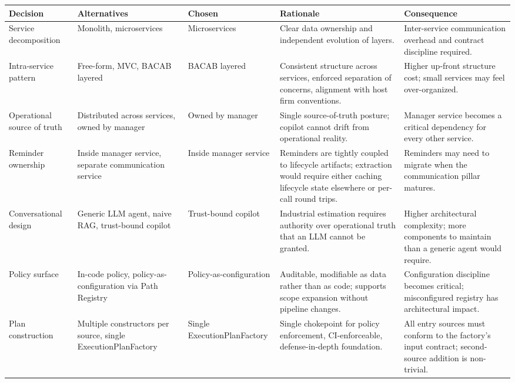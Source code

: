 \begin{table}[H]
\centering
\renewcommand{\arraystretch}{1.4}
\footnotesize
\begin{tabular}{|p{2.6cm}|p{2.5cm}|p{2.5cm}|p{3cm}|p{3cm}|}
\hline
\rowcolor{lightgray}
\textbf{Decision} & \textbf{Alternatives} & \textbf{Chosen} & \textbf{Rationale} & \textbf{Consequence} \\ \hline
Service decomposition & Monolith, microservices & Microservices & Clear data ownership and independent evolution of layers. & Inter-service communication overhead and contract discipline required. \\ \hline
Intra-service pattern & Free-form, MVC, BACAB layered & BACAB layered & Consistent structure across services, enforced separation of concerns, alignment with host firm conventions. & Higher up-front structure cost; small services may feel over-organized. \\ \hline
Operational source of truth & Distributed across services, owned by manager & Owned by manager & Single source-of-truth posture; copilot cannot drift from operational reality. & Manager service becomes a critical dependency for every other service. \\ \hline
Reminder ownership & Inside manager service, separate communication service & Inside manager service & Reminders are tightly coupled to lifecycle artifacts; extraction would require either caching lifecycle state elsewhere or per-call round trips. & Reminders may need to migrate when the communication pillar matures. \\ \hline
Conversational design & Generic LLM agent, naive RAG, trust-bound copilot & Trust-bound copilot & Industrial estimation requires authority over operational truth that an LLM cannot be granted. & Higher architectural complexity; more components to maintain than a generic agent would require. \\ \hline
Policy surface & In-code policy, policy-as-configuration via Path Registry & Policy-as-configuration & Auditable, modifiable as data rather than as code; supports scope expansion without pipeline changes. & Configuration discipline becomes critical; misconfigured registry has architectural impact. \\ \hline
Plan construction & Multiple constructors per source, single ExecutionPlanFactory & Single ExecutionPlanFactory & Single chokepoint for policy enforcement, CI-enforceable, defense-in-depth foundation. & All entry sources must conform to the factory's input contract; second-source addition is non-trivial. \\ \hline

\end{tabular}
\end{table}
